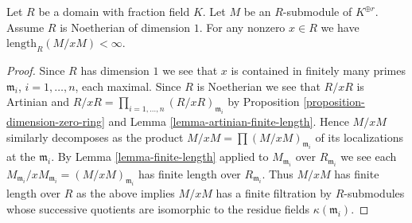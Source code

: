 \begin{lemma}
\label{lemma-finite-length-global}
Let $R$ be a domain with fraction field $K$.
Let $M$ be an $R$-submodule of $K^{\oplus r}$.
Assume $R$ is Noetherian of dimension $1$.
For any nonzero $x \in R$ we have
$\text{length}_R(M/xM) < \infty$.
\end{lemma}

\begin{proof}
Since $R$ has dimension $1$ we see that $x$ is contained in finitely many
primes $\mathfrak m_i$, $i = 1, \ldots, n$, each maximal. Since $R$ is
Noetherian we see that $R/xR$ is Artinian and
$R/xR = \prod_{i = 1, \ldots, n} (R/xR)_{\mathfrak m_i}$ by
Proposition \ref{proposition-dimension-zero-ring} and
Lemma \ref{lemma-artinian-finite-length}. Hence $M/xM$ similarly
decomposes as the product $M/xM = \prod (M/xM)_{\mathfrak m_i}$
of its localizations at the $\mathfrak m_i$. By Lemma \ref{lemma-finite-length}
applied to $M_{\mathfrak m_i}$ over $R_{\mathfrak m_i}$ we see each
$M_{\mathfrak m_i}/xM_{\mathfrak m_i} = (M/xM)_{\mathfrak m_i}$
has finite length over $R_{\mathfrak m_i}$. Thus $M/xM$
has finite length over $R$ as the above implies $M/xM$
has a finite filtration by $R$-submodules whose successive
quotients are isomorphic to the residue fields $\kappa(\mathfrak m_i)$.
\end{proof}
